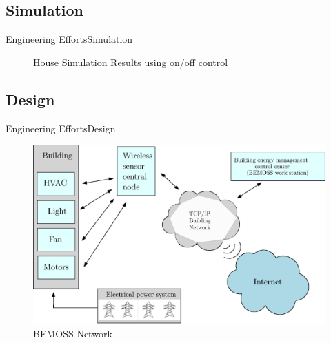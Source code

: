 \documentclass{beamer}
\begin{document}
\subsection{Simulation}
\begin{frame}{Engineering Efforts}{Simulation}
  \begin{figure}
      \label{fig:House Simulation Results}
      \caption{House Simulation Results using on/off control}
\end{figure}
\end{frame}
\subsection{Design}

\begin{frame}{Engineering Efforts}{Design}
  \begin{figure}
    \centering
    \includegraphics[scale=.6]{figs/ipe/HighLevelBemoss.eps}
    \caption{BEMOSS Network}
    \label{fig:BEMOSS Network}
\end{figure}
\end{frame}
\end{document}
